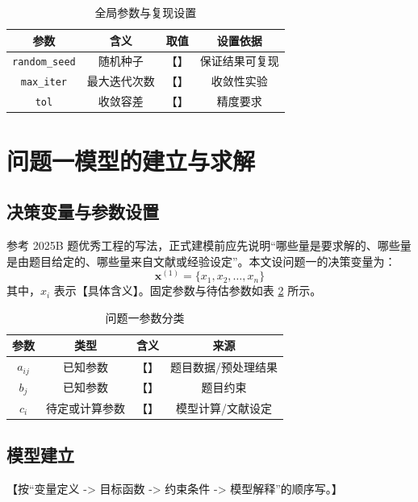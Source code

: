 \documentclass{cumcmthesis}
\begin{document}
\begin{table}[H]
  \centering
  \caption{全局参数与复现设置}
  \label{tab:global-params}
  \begin{tabular}{cccc}
    \toprule
    参数 & 含义 & 取值 & 设置依据 \\
    \midrule
    \texttt{random\_seed} & 随机种子 & 【】 & 保证结果可复现 \\
    \texttt{max\_iter} & 最大迭代次数 & 【】 & 收敛性实验 \\
    \texttt{tol} & 收敛容差 & 【】 & 精度要求 \\
    \bottomrule
  \end{tabular}
\end{table}

\section{问题一模型的建立与求解}

\subsection{决策变量与参数设置}
参考 2025B 题优秀工程的写法，正式建模前应先说明“哪些量是要求解的、哪些量是由题目给定的、哪些量来自文献或经验设定”。本文设问题一的决策变量为：
\begin{equation}
  \mathbf{x}^{(1)} = \{x_1, x_2,\ldots,x_n\}
  \label{eq:q1-vars}
\end{equation}
其中，$x_i$ 表示【具体含义】。固定参数与待估参数如表 \ref{tab:q1-params} 所示。

\begin{table}[H]
  \centering
  \caption{问题一参数分类}
  \label{tab:q1-params}
  \begin{tabular}{cccc}
    \toprule
    参数 & 类型 & 含义 & 来源 \\
    \midrule
    $a_{ij}$ & 已知参数 & 【】 & 题目数据/预处理结果 \\
    $b_j$ & 已知参数 & 【】 & 题目约束 \\
    $c_i$ & 待定或计算参数 & 【】 & 模型计算/文献设定 \\
    \bottomrule
  \end{tabular}
\end{table}

\subsection{模型建立}
【按“变量定义 -> 目标函数 -> 约束条件 -> 模型解释”的顺序写。】
\end{document}
